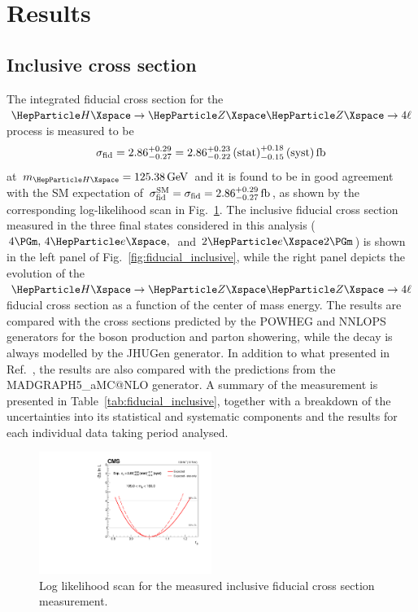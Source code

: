 \section{Results}
\label{sec:results}

\subsection{Inclusive cross section}
The integrated fiducial cross section for the $\HZZfl$ process is measured to be
$$\sigma_{{\mathrm{fid}}}=2.86^{+0.29}_{-0.27}=2.86^{+0.23}_{-0.22}\,\text{(stat)}^{+0.18}_{-0.15}\,\text{(syst)} \text{\,fb}$$ at $\mH = 125.38\GeV$
and it is found to be in good agreement with the SM expectation of $\sigma_{{\mathrm{fid}}}^{\mathrm{SM}}=\sigma_{{\mathrm{fid}}}=2.86^{+0.29}_{-0.27}\text{\,fb}$, as shown by the corresponding log-likelihood scan in Fig.~\ref{fig:fiducial_LLScan}.
The inclusive fiducial cross section measured in the three final states considered in this analysis ($4\Pgm,\,4\Pe,\,$ and $2\Pe 2\Pgm$)  is shown in the left panel of Fig.~\ref{fig:fiducial_inclusive}, while the right panel depicts the evolution of the $\HZZfl$ fiducial cross section as a function of the center of mass energy.
The results are compared with the cross sections predicted by the POWHEG and NNLOPS generators for the \PH boson production and parton showering, while the decay is always modelled by the JHUGen generator.
In addition to what presented in Ref.~\cite{CMSHIG19001}, the results are also compared with the predictions from the MADGRAPH5\_aMC@NLO generator.
A summary of the measurement is presented in Table~\ref{tab:fiducial_inclusive}, together with a breakdown of the uncertainties into its statistical and systematic components and the results for each individual data taking period analysed.


\begin{figure}[!htb]
	\centering
	\includegraphics[width=0.5\textwidth]{Images/H4L/lhscan_compare_mass4l_SigmaBin0.pdf}
	\caption{
		Log likelihood scan for the measured inclusive fiducial cross section measurement.
		\label{fig:fiducial_LLScan}}
\end{figure}

